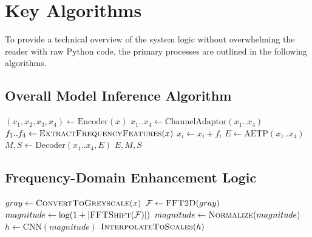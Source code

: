 \documentclass[12pt,a4paper]{report}
\begin{document}
\section{Key Algorithms}

To provide a technical overview of the system logic without overwhelming the reader with raw Python code, the primary processes are outlined in the following algorithms.

\subsection{Overall Model Inference Algorithm}

\begin{algorithm}[H]
\caption{Extended ESCNet Forward Inference}
\begin{algorithmic}[1]
    \State $(x_1, x_2, x_3, x_4) \gets \text{Encoder}(x)$ 
    \State $x_1..x_4 \gets \text{ChannelAdaptor}(x_1..x_4)$ 
        \State $f_1..f_4 \gets \Call{ExtractFrequencyFeatures}{x}$
        \State $x_i \gets x_i + f_i$ 
    \EndIf
    \State $E \gets \text{AETP}(x_1..x_4)$ 
    \State $M, S \gets \text{Decoder}(x_1..x_4, E)$ 
    \State \Return $E, M, S$
\EndProcedure
\end{algorithmic}
\end{algorithm}

\subsection{Frequency-Domain Enhancement Logic}

\begin{algorithm}[H]
\caption{Frequency Feature Extraction}
\begin{algorithmic}[1]
    \State $gray \gets \Call{ConvertToGreyscale}{x}$
    \State $\mathcal{F} \gets \Call{FFT2D}{gray}$ 
    \State $magnitude \gets \log(1 + |\Call{FFTShift}{\mathcal{F}}|)$
    \State $magnitude \gets \Call{Normalize}{magnitude}$
    \State $h \gets \text{CNN}(magnitude)$ 
    \State \Return $\Call{InterpolateToScales}{h}$
\EndProcedure
\end{algorithmic}
\end{algorithm}
\end{document}
